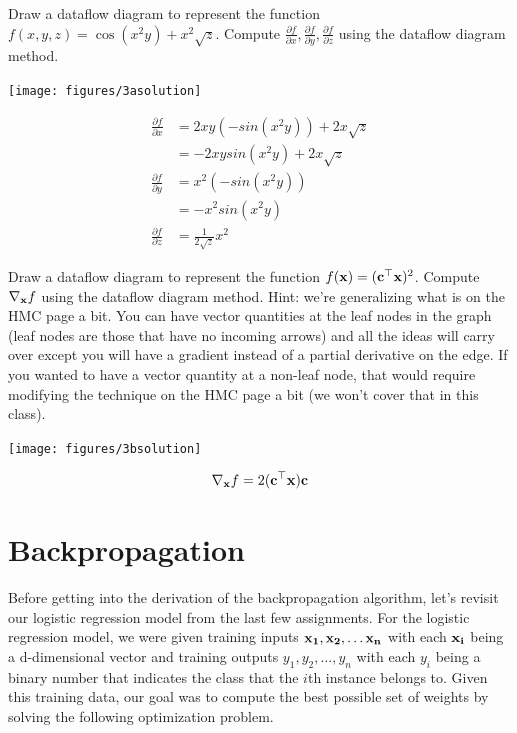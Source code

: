 \documentclass[assignment06_Solutions]{subfiles}
\begin{document}
\begin{exercise}[(20 minutes)]
\bes
\item Draw a dataflow diagram to represent the function $f(x,y,z) = \cos(x^2 y) + x^2 \sqrt{z}$.  Compute $\frac{\partial f}{\partial x}, \frac{\partial f}{\partial y}, \frac{\partial f}{\partial z}$ using the dataflow diagram method.
\begin{boxedsolution}
\begin{center}
\texttt{[image: figures/3asolution]}
\end{center}
\begin{align}
\frac{\partial f}{\partial x}&= 2x y (-sin(x^2 y)) + 2x{\sqrt z} \nonumber \\
&= -2x y sin(x^2 y) + 2x{\sqrt z} \\
\frac{\partial f}{\partial y} &= x^2 (-sin(x^2 y)) \nonumber \\
&= -x^2 sin(x^2 y) \\
\frac{\partial f}{\partial z} &= \frac{1}{2 \sqrt z} x^2
\end{align}
\end{boxedsolution}
\item Draw a dataflow diagram to represent the function $f(\mathbf{x}) = (\mathbf{c}^\top \mathbf{x})^2$.  Compute $\nabla_{\mathbf{x}} f$ using the dataflow diagram method.  Hint: we're generalizing what is on the HMC page a bit.  You can have vector quantities at the leaf nodes in the graph (leaf nodes are those that have no incoming arrows) and all the ideas will carry over except you will have a gradient instead of a partial derivative on the edge.  If you wanted to have a vector quantity at a non-leaf node, that would require modifying the technique on the HMC page a bit (we won't cover that in this class).
\begin{boxedsolution}
\begin{center}
\texttt{[image: figures/3bsolution]}
\end{center}
\begin{align}
\nabla_{\mathbf{x}} f = 2(\mathbf{c}^\top \mathbf{x}) \mathbf{c}
\end{align}
\end{boxedsolution}
\ees
\end{exercise}


\section{Backpropagation}

Before getting into the derivation of the backpropagation algorithm, let's revisit our logistic regression model from the last few assignments.  For the logistic regression model, we were given training inputs $\mathbf{x_1}, \mathbf{x_2}, \ldots \mathbf{x_n}$ with each $\mathbf{x_i}$ being a d-dimensional vector and training outputs $y_1, y_2, \ldots, y_n$ with each $y_i$ being a binary number that indicates the class that the $i$th instance belongs to.  Given this training data, our goal was to compute the best possible set of weights by solving the following optimization problem.
\end{document}
